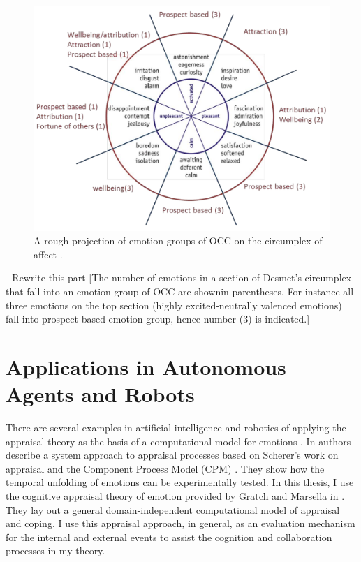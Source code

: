 \documentclass[11pt]{article}
\begin{document}
\begin{figure}[tbh]
  \center
  \includegraphics[width=.9\textwidth]{figure/occ-circumplex-mapping.png}
  \caption{A rough projection of emotion groups of OCC on the circumplex of
  affect \cite{mehrabian:pad}.}
  \label{fig:occ-circumplex}
\end{figure}

- Rewrite this part [The number of emotions in a section of Desmet’s circumplex
that fall into an emotion group of OCC are shownin parentheses. For instance all
three emotions on the top section (highly excited-neutrally valenced emotions)
fall into prospect based emotion group, hence number (3) is indicated.]

\section{Applications in Autonomous Agents and Robots}

There are several examples in artificial intelligence and robotics of applying
the appraisal theory as the basis of a computational model for emotions
\cite{adam:bdi-emotional-companion,kim:model-hri-appraisal,
marsella:ema-process-model}. In \cite{sander:systems-approach-appraisal} authors
describe a system approach to appraisal processes based on Scherer's work on
appraisal and the Component Process Model (CPM)
\cite{scherer:nature-function-emotion}. They show how the temporal unfolding
of emotions can be experimentally tested. In this thesis, I use the cognitive
appraisal theory of emotion provided by Gratch and Marsella in
\cite{gratch:domain-independent}. They lay out a general domain-independent
computational model of appraisal and coping. I use this appraisal approach,
in general, as an evaluation mechanism for the internal and external events to
assist the cognition and collaboration processes in my theory.
\end{document}
